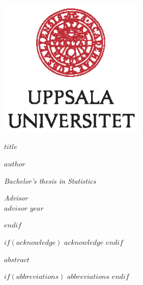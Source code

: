 \documentclass[a4paper,11pt]{article}
\renewcommand{\baselinestretch}{1.5}
\begin{document}
\thispagestyle{empty}
\begin{center}
\includegraphics[width=7cm]{UU_logo_CMYK.eps}
\end{center}
\vspace{1.5cm}
\begin{center}
\begin{Large}
{\bf $title$} 
\end{Large}
\end{center}
\vskip1.5cm
\renewcommand{\baselinestretch}{1}
\begin{center}
{\large $author$} 
\vskip2.5cm
\begin{center}
\begin{large}
{\it Bachelor's thesis in Statistics}\\
\end{large}
\end{center}
\vskip2cm
{\large\it Advisor}\\
{\large $advisor$} 
\vskip2cm
{\large $year$} 
\end{center}\vfill
$endif$


$if(acknowledge)$
\newpage
$acknowledge$
$endif$
\pagestyle{plain}
\setcounter{page}{1}    %

\newpage
$abstract$

\newpage
\tableofcontents
\clearpage

$if(abbreviations)$
\newpage
$abbreviations$
$endif$
\end{document}

